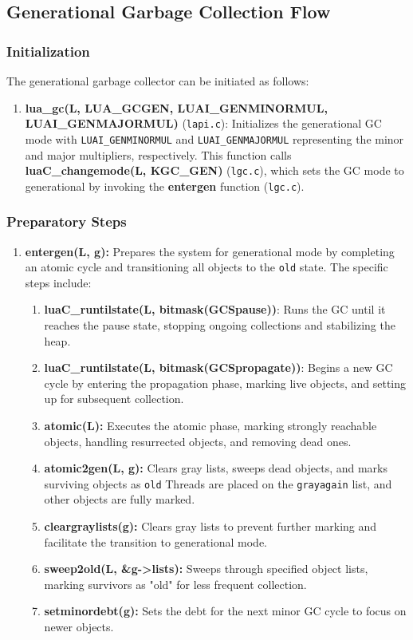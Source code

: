 \documentclass[10pt]{article}
\begin{document}
\subsection{Generational Garbage Collection Flow}

\subsubsection{Initialization}
The generational garbage collector can be initiated as follows:
\begin{enumerate}
    \item \textbf{lua\_gc(L, LUA\_GCGEN, LUAI\_GENMINORMUL, LUAI\_GENMAJORMUL)} (\texttt{lapi.c}): Initializes the generational GC mode with \texttt{LUAI\_GENMINORMUL} and \texttt{LUAI\_GENMAJORMUL} representing the minor and major multipliers, respectively. This function calls \textbf{luaC\_changemode(L, KGC\_GEN)} (\texttt{lgc.c}), which sets the GC mode to generational by invoking the \textbf{entergen} function (\texttt{lgc.c}).
\end{enumerate}

\subsubsection{Preparatory Steps}
\begin{enumerate}
    \item \textbf{entergen(L, g):} Prepares the system for generational mode by completing an atomic cycle and transitioning all objects to the \texttt{old} state. The specific steps include:
    \begin{enumerate}
        \item \textbf{luaC\_runtilstate(L, bitmask(GCSpause))}: Runs the GC until it reaches the pause state, stopping ongoing collections and stabilizing the heap.
        \item \textbf{luaC\_runtilstate(L, bitmask(GCSpropagate))}: Begins a new GC cycle by entering the propagation phase, marking live objects, and setting up for subsequent collection.
        \item \textbf{atomic(L):} Executes the atomic phase, marking strongly reachable objects, handling resurrected objects, and removing dead ones.
        \item \textbf{atomic2gen(L, g):} Clears gray lists, sweeps dead objects, and marks surviving objects as \texttt{old} Threads are placed on the \texttt{grayagain} list, and other objects are fully marked.
        \item \textbf{cleargraylists(g):} Clears gray lists to prevent further marking and facilitate the transition to generational mode.
        \item \textbf{sweep2old(L, \&g-\textgreater lists):} Sweeps through specified object lists, marking survivors as "old" for less frequent collection.
        \item \textbf{setminordebt(g):} Sets the debt for the next minor GC cycle to focus on newer objects.
    \end{enumerate}
\end{enumerate}
\end{document}
